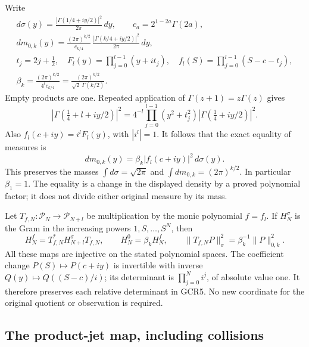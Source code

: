 Write
\[
\begin{gathered}
 d\sigma(y)=\frac{|\Gamma(1/4+iy/2)|^2}{2\pi}\,dy,\qquad
 c_a=2^{1-2a}\Gamma(2a),\\
 dm_{0,k}(y)=\frac{(2\pi)^{k/2}}{c_{k/4}}\,
                \frac{|\Gamma(k/4+iy/2)|^2}{2\pi}\,dy,\\
 t_j=2j+\tfrac12,\quad
 F_l(y)=\prod_{j=0}^{l-1}(y+it_j),\quad
 f_l(S)=\prod_{j=0}^{l-1}(S-c-t_j),\\
 \beta_k=\frac{(2\pi)^{k/2}}{4^l c_{k/4}}
         =\frac{(2\pi)^{k/2}}{\sqrt2\,\Gamma(k/2)}.
\end{gathered}\tag{GCR3}
\]
Empty products are one. Repeated application of
$\Gamma(z+1)=z\Gamma(z)$ gives
\[
 \left|\Gamma(\tfrac14+l+iy/2)\right|^2
 =4^{-l}\prod_{j=0}^{l-1}(y^2+t_j^2)
                      |\Gamma(\tfrac14+iy/2)|^2.
\]
Also $f_l(c+iy)=i^lF_l(y)$, with $|i^l|=1$.
It follows that the exact equality of measures is
\[
 \boxed{\quad dm_{0,k}(y)=\beta_k
                 |f_l(c+iy)|^2\,d\sigma(y).\quad}
\tag{GCR4}
\]
This preserves the masses
$\int d\sigma=\sqrt{2\pi}$ and
$\int dm_{0,k}=(2\pi)^{k/2}$. In particular $\beta_1=1$.
The equality is a change in the displayed density by a proved
polynomial factor; it does not divide either original measure
by its mass.

Let $T_{f,N}:\mathcal P_N\to\mathcal P_{N+l}$ be multiplication
by the monic polynomial $f=f_l$. If $H^\sigma_N$ is the Gram
in the increasing powers $1,S,\ldots,S^N$, then
\[
 H^f_N=T_{f,N}^*H^\sigma_{N+l}T_{f,N},\qquad
 H^0_N=\beta_k H^f_N,\qquad
 \|T_{f,N}P\|_\sigma^2=\beta_k^{-1}\|P\|_{0,k}^2.
\tag{GCR5}
\]
All these maps are injective on the stated polynomial spaces.
The coefficient change $P(S)\mapsto P(c+iy)$ is invertible with
inverse $Q(y)\mapsto Q((S-c)/i)$; its determinant is
$\prod_{j=0}^N i^j$, of absolute value one. It therefore preserves
each relative determinant in GCR5. No new coordinate for the
original quotient or observation is required.

\subsection{The product-jet map, including collisions}

